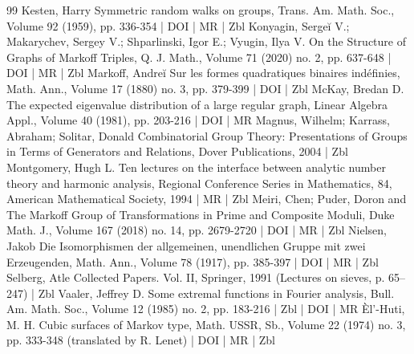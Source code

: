 \documentclass[10pt]{amsart}
\theoremstyle{definition}\newtheorem{defi}[theo]{Definition}\newtheorem{rema}[theo]{Remark}\newtheorem{exam}[theo]{Example}\newtheorem{exem}[theo]{Example}\newtheorem{nota}[theo]{Notation}
\begin{document}
\begin{thebibliography}{99}
Kesten, Harry Symmetric random walks on groups, Trans. Am. Math. Soc., Volume 92 (1959), pp. 336-354 | DOI | MR | Zbl
Konyagin, Sergeĭ V.; Makarychev, Sergey V.; Shparlinski, Igor E.; Vyugin, Ilya V. On the Structure of Graphs of Markoff Triples, Q. J. Math., Volume 71 (2020) no. 2, pp. 637-648 | DOI | MR | Zbl
Markoff, Andreĭ Sur les formes quadratiques binaires indéfinies, Math. Ann., Volume 17 (1880) no. 3, pp. 379-399 | DOI | Zbl
McKay, Bredan D. The expected eigenvalue distribution of a large regular graph, Linear Algebra Appl., Volume 40 (1981), pp. 203-216 | DOI | MR
Magnus, Wilhelm; Karrass, Abraham; Solitar, Donald Combinatorial Group Theory: Presentations of Groups in Terms of Generators and Relations, Dover Publications, 2004 | Zbl
Montgomery, Hugh L. Ten lectures on the interface between analytic number theory and harmonic analysis, Regional Conference Series in Mathematics, 84, American Mathematical Society, 1994 | MR | Zbl
Meiri, Chen; Puder, Doron and The Markoff Group of Transformations in Prime and Composite Moduli, Duke Math. J., Volume 167 (2018) no. 14, pp. 2679-2720 | DOI | MR | Zbl
Nielsen, Jakob Die Isomorphismen der allgemeinen, unendlichen Gruppe mit zwei Erzeugenden, Math. Ann., Volume 78 (1917), pp. 385-397 | DOI | MR | Zbl
Selberg, Atle Collected Papers. Vol. II, Springer, 1991 (Lectures on sieves, p. 65–247) | Zbl
Vaaler, Jeffrey D. Some extremal functions in Fourier analysis, Bull. Am. Math. Soc., Volume 12 (1985) no. 2, pp. 183-216 | Zbl | DOI | MR
Èl’-Huti, M. H. Cubic surfaces of Markov type, Math. USSR, Sb., Volume 22 (1974) no. 3, pp. 333-348 (translated by R. Lenet) | DOI | MR | Zbl
\end{thebibliography}
\end{document}
